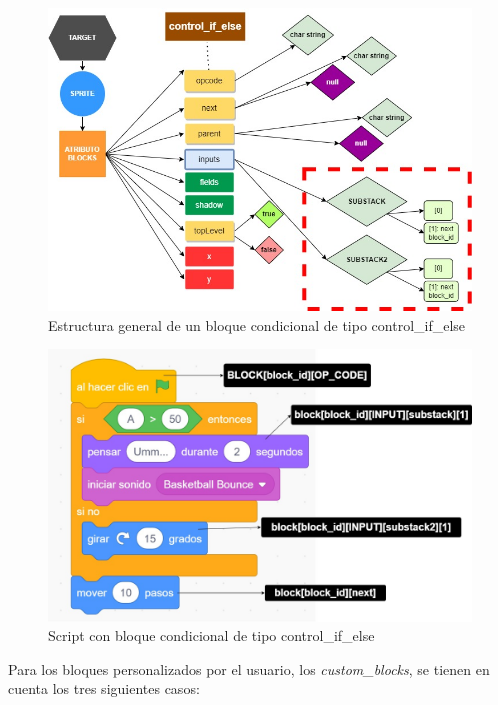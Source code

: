 \documentclass[a4paper, 12pt]{book}
\begin{document}
\begin{figure}
  \centering
  \includegraphics[width=15cm, keepaspectratio]{img/controlblock_spe.jpg}
  \caption{Estructura general de un bloque condicional de tipo control\_if\_else}
  \label{fig:controlblock_spe}
\end{figure}

\begin{figure}
  \centering
  \includegraphics[width=13cm, keepaspectratio]{img/scratch_special.jpg}
  \caption{Script con bloque condicional de tipo control\_if\_else}
  \label{fig:scratch_special}
\end{figure}

\newpage 
Para los bloques personalizados por el usuario, los \textit{custom\_blocks}, se tienen en cuenta los tres siguientes casos:
\end{document}
